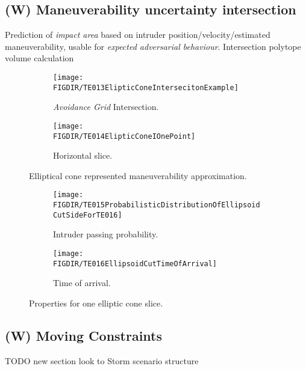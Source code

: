\subsection{(W) Maneuverability uncertainty intersection}\label{s:uncertaintyIntersection}
    \noindent Prediction of \emph{impact area} based on intruder position/velocity/estimated maneuverability, usable for \emph{expected adversarial behaviour}. Intersection polytope volume calculation \cite{lawrence1991polytope}
    
    \begin{figure}[H]
    	\centering
        \begin{subfigure}{0.48\textwidth}
            \texttt{[image: \\FIGDIR/TE013ElipticConeIntersecitonExample]}
            \caption{\emph{Avoidance Grid} Intersection.}
            \label{fig:ellipticConeIntersectionExample}
        \end{subfigure}
        \begin{subfigure}{0.48\textwidth}
            \texttt{[image: \\FIGDIR/TE014ElipticConeIOnePoint]} 
            \caption{Horizontal slice.}
            \label{fig:ellipticalConeHorizontalSlice}
        \end{subfigure}
        \caption{Elliptical cone represented maneuverability approximation. }
        \label{fig:ellipticalConeRepresentedManuevurabilityApproximation}
    \end{figure}
    
    \begin{figure}[H]
    	\centering
        \begin{subfigure}{0.48\textwidth}
            \texttt{[image: \\FIGDIR/TE015ProbabilisticDistributionOfEllipsoidCutSideForTE016]}
            \caption{Intruder passing probability.}
            \label{fig:intruderPassingProbability}
        \end{subfigure}
        \begin{subfigure}{0.48\textwidth}
            \texttt{[image: \\FIGDIR/TE016EllipsoidCutTimeOfArrival]} 
            \caption{Time of arrival.}
            \label{fig:intruderTimeOfArrival}
        \end{subfigure}
        \caption{Properties for one elliptic cone slice. }
        \label{fig:propertiesEllipticConeSlice}
    \end{figure}

\subsection{(W) Moving Constraints}\label{s:MovingVirtualConstraints}
TODO new section look to Storm scenario structure
